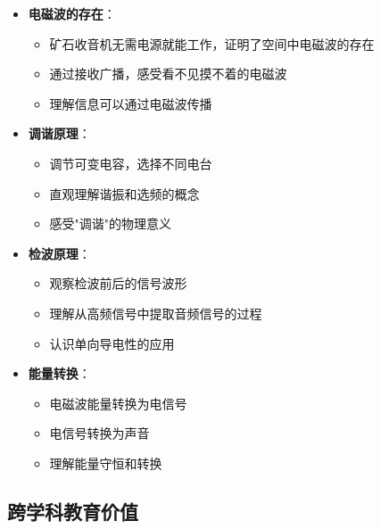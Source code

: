 \documentclass[12pt,UTF8]{ctexbook}
\begin{document}
\begin{itemize}[leftmargin=3.5em]
    \item \textbf{电磁波的存在}：
        \begin{itemize}[leftmargin=3.5em]
            \item 矿石收音机无需电源就能工作，证明了空间中电磁波的存在
            \item 通过接收广播，感受看不见摸不着的电磁波
            \item 理解信息可以通过电磁波传播
        \end{itemize}
    \item \textbf{调谐原理}：
        \begin{itemize}[leftmargin=3.5em]
            \item 调节可变电容，选择不同电台
            \item 直观理解谐振和选频的概念
            \item 感受"调谐"的物理意义
        \end{itemize}
    \item \textbf{检波原理}：
        \begin{itemize}[leftmargin=3.5em]
            \item 观察检波前后的信号波形
            \item 理解从高频信号中提取音频信号的过程
            \item 认识单向导电性的应用
        \end{itemize}
    \item \textbf{能量转换}：
        \begin{itemize}[leftmargin=3.5em]
            \item 电磁波能量转换为电信号
            \item 电信号转换为声音
            \item 理解能量守恒和转换
        \end{itemize}
\end{itemize}

\subsection{跨学科教育价值}
\end{document}
